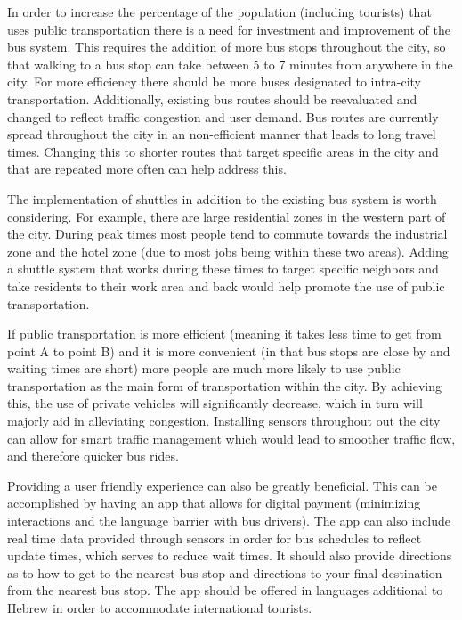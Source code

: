 \documentclass[12pt]{article}                       %
\begin{document}
In order to increase the percentage of the population (including tourists) that uses public transportation there is a need for investment and improvement of the bus system. This requires the addition of more bus stops throughout the city, so that walking to a bus stop can take between 5 to 7 minutes from anywhere in the city. For more efficiency there should be more buses designated to intra-city transportation. Additionally, existing bus routes should be reevaluated and changed to reflect traffic congestion and user demand. Bus routes are currently spread throughout the city in an non-efficient manner that leads to long travel times. Changing this to shorter routes that target specific areas in the city and that are repeated more often can help address this.

The implementation of shuttles in addition to the existing bus system is worth considering. For example, there are large residential zones in the western part of the city. During peak times most people tend to commute towards the industrial zone and the hotel zone (due to most jobs being within these two areas). Adding a shuttle system that works during these times to target specific neighbors and take residents to their work area and back would help promote the use of public transportation.
    
If public transportation is more efficient (meaning it takes less time to get from point A to point B) and it is more convenient (in that bus stops are close by and waiting times are short) more people are much more likely to use public transportation as the main form of transportation within the city. By achieving this, the use of private vehicles will significantly decrease, which in turn will majorly aid in alleviating congestion. Installing sensors throughout out the city can allow for smart traffic management which would lead to smoother traffic flow, and therefore quicker bus rides.

Providing a user friendly experience can also be greatly beneficial. This can be accomplished by having an app that allows for digital payment (minimizing interactions and the language barrier with bus drivers). The app can also include real time data provided through sensors in order for bus schedules to reflect update times, which serves to reduce wait times. It should also provide directions as to how to get to the nearest bus stop and directions to your final destination from the nearest bus stop. The app should be offered in languages additional to Hebrew in order to accommodate international tourists. 
\end{document}
